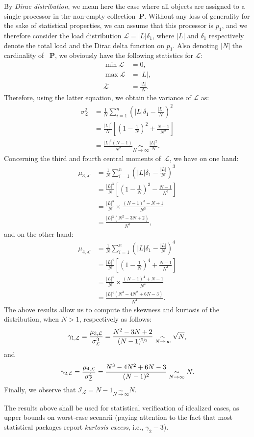 By \emph{Dirac distribution}, we mean here the case where all objects
are assigned to a single processor in the non-empty
collection~$\mathbf{P}$. Without any loss of generality for the sake
of statistical properties, we can assume that this processor is $p_1$,
and we therefore consider the load distribution
$\mathcal{L}=\vert{L}\vert{}\delta_1$, where $\vert{L}\vert$ and $\delta_1$
respectively denote the total load and the Dirac delta function on
$p_1$.
Also denoting $\vert{N}\vert$ the cardinality of ~$\mathbf{P}$, we
obviously have the following statistics for $\mathcal{L}$:
\begin{align*}
\min{\mathcal{L}}
&= 0,\\
\max{\mathcal{L}}
&= \vert{L}\vert{},\\
\overline{\mathcal{L}}
&= \frac{\vert{L}\vert{}}{N}.
\end{align*}
Therefore, using the latter equation, we obtain the variance of
$\mathcal{L}$ as:
\begin{align*}
\sigma_{\mathcal{L}}^2
&= \frac{1}{N}\sum_{i=1}^n\left(
\vert{L}\vert{}\delta_1 - \frac{\vert{L}\vert}{N}\right)^2\\
&= \frac{\vert{L}\vert^2}{N}\left[\left(
1 - \frac{1}{N}\right)^2 +\frac{N-1}{N^2}\right]\\
&= \frac{\vert{L}\vert^2(N - 1)}{N^2}
\underset{N\to\infty}{\sim}\frac{\vert{L}\vert{}^2}{N}.
\end{align*}
Concerning the third and fourth central moments of~$\mathcal{L}$, we
have on one hand:
\begin{align*}
\mu_{3,\mathcal{L}}
&= \frac{1}{N}\sum_{i=1}^n\left(
\vert{L}\vert{}\delta_1 - \frac{\vert{L}\vert}{N}\right)^3\\
&= \frac{\vert{L}\vert^3}{N}\left[\left(
1 - \frac{1}{N}\right)^3 - \frac{N-1}{N^3}\right]\\
&= \frac{\vert{L}\vert^3}{N}\times\frac{(N-1)^3 - N + 1}{N^3}\\
&= \frac{\vert{L}\vert{}^3(N^2 - 3N + 2)}{N^3},
\end{align*}
and on the other hand:
\begin{align*}
\mu_{4,\mathcal{L}}
&= \frac{1}{N}\sum_{i=1}^n\left(
\vert{L}\vert{}\delta_1 - \frac{\vert{L}\vert}{N}\right)^4\\
&= \frac{\vert{L}\vert^4}{N}\left[\left(
1 - \frac{1}{N}\right)^4 +\frac{N-1}{N^4}\right]\\
&= \frac{\vert{L}\vert^4}{N}\times\frac{(N - 1)^4 + N - 1}{N^4}\\
&= \frac{\vert{L}\vert{}^4(N^3 - 4N^2 + 6N -3)}{N^4}.
\end{align*}
The above results allow us to compute the skewness and kurtosis of the
distribution, when $N>1$, respectively as follows:
\[
\gamma_{1,\mathcal{L}}
= \frac{\mu_{3,\mathcal{L}}}{\sigma_{\mathcal{L}}^3}\\
= \frac{N^2 - 3N + 2}{(N-1)^{\sfrac{3}{2}}}
\underset{N\to\infty}{\sim}\sqrt{N},
\]
and
\[
\gamma_{2,\mathcal{L}}
= \frac{\mu_{4,\mathcal{L}}}{\sigma_{\mathcal{L}}^4}\\
= \frac{N^3 - 4N^2 + 6N -3}{(N - 1)^2}
\underset{N\to\infty}{\sim}N.
\]
Finally, we observe that 
$\mathcal{I}_{\mathcal{L}}= N-1\underset{N\to\infty}{\sim}N$.

The results above shall be used for statistical verification of
idealized cases, as upper bounds on worst-case scenarii (paying
attention to the fact that most statistical packages report
\emph{kurtosis excess}, i.e., $\gamma_2-3$).

